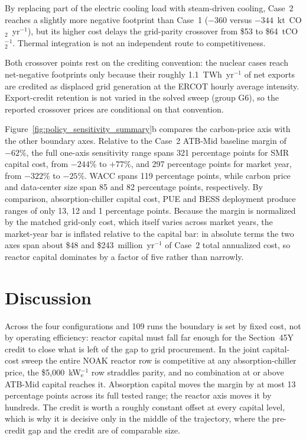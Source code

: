 \documentclass[a4paper,fleqn]{cas-sc}
\begin{document}
By replacing part of the electric cooling load with steam-driven cooling, Case~2 reaches a slightly more negative footprint than Case~1 ($-360$ versus $-344$~kt~CO$_2$~yr$^{-1}$), but its higher cost delays the grid-parity crossover from \$53 to \$64~tCO$_2^{-1}$. Thermal integration is not an independent route to competitiveness.

Both crossover points rest on the crediting convention: the nuclear cases reach net-negative footprints only because their roughly 1.1~TWh~yr$^{-1}$ of net exports are credited as displaced grid generation at the ERCOT hourly average intensity. Export-credit retention is not varied in the solved sweep (group G6), so the reported crossover prices are conditional on that convention.

Figure~\ref{fig:policy_sensitivity_summary}b compares the carbon-price axis with the other boundary axes. Relative to the Case~2 ATB-Mid baseline margin of $-62\%$, the full one-axis sensitivity range spans 321 percentage points for SMR capital cost, from $-244\%$ to $+77\%$, and 297 percentage points for market year, from $-322\%$ to $-25\%$. WACC spans 119 percentage points, while carbon price and data-center size span 85 and 82 percentage points, respectively. By comparison, absorption-chiller capital cost, PUE and BESS deployment produce ranges of only 13, 12 and 1 percentage points. Because the margin is normalized by the matched grid-only cost, which itself varies across market years, the market-year bar is inflated relative to the capital bar: in absolute terms the two axes span about \$48 and \$243~million~yr$^{-1}$ of Case~2 total annualized cost, so reactor capital dominates by a factor of five rather than narrowly.

\section{Discussion}
\label{sec:discussion}


Across the four configurations and 109 runs the boundary is set by fixed cost, not by operating efficiency: reactor capital must fall far enough for the Section~45Y credit to close what is left of the gap to grid procurement. In the joint capital-cost sweep the entire NOAK reactor row is competitive at any absorption-chiller price, the \$5{,}000~kW$_\mathrm{e}^{-1}$ row straddles parity, and no combination at or above ATB-Mid capital reaches it. Absorption capital moves the margin by at most 13 percentage points across its full tested range; the reactor axis moves it by hundreds. The credit is worth a roughly constant offset at every capital level, which is why it is decisive only in the middle of the trajectory, where the pre-credit gap and the credit are of comparable size.
\end{document}
